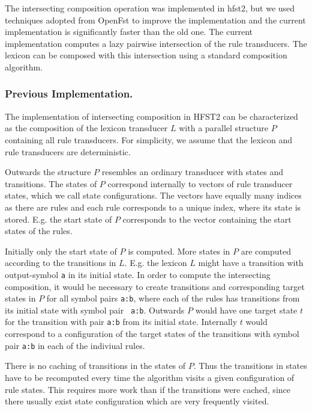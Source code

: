 \documentclass{llncs}
\begin{document}
The intersecting composition operation was implemented in hfst2, but
we used techniques adopted from OpenFst \cite{openfst/2007} to improve
the implementation and the current implementation is significantly
faster than the old one. The current implementation computes a lazy
pairwise intersection of the rule transducers. The lexicon can be
composed with this intersection using a standard composition
algorithm.

\subsubsection{Previous Implementation.}

The implementation of intersecting composition in HFST2 can be
characterized as the composition of the lexicon transducer $L$ with a
parallel structure $P$ containing all rule transducers. For simplicity,
we assume that the lexicon and rule transducers are deterministic.

Outwards the structure $P$ resembles an ordinary transducer with
states and transitions. The states of $P$ correspond internally to
vectors of rule transducer states, which we call state
configurations. The vectors have equally many indices as there are rules
and each rule corresponds to a unique index, where its state is
stored. E.g. the start state of $P$ corresponds to the vector
containing the start states of the rules.

Initially only the start state of $P$ is computed. More states in $P$
are computed according to the transitions in $L$. E.g. the lexicon $L$
might have a transition with output-symbol {\tt a} in its initial
state. In order to compute the intersecting composition, it would be
necessary to create transitions and corresponding target states in $P$
for all symbol pairs {\tt a:b}, where each of the rules has
transitions from its initial state with symbol pair {\tt
  a:b}. Outwards $P$ would have one target state $t$ for the
transition with pair {\tt a:b} from its initial state. Internally $t$
would correspond to a configuration of the target states of the
transitions with symbol pair {\tt a:b} in each of the indiviual rules.

There is no caching of transitions in the states of $P$. Thus the
transitions in states have to be recomputed every time the algorithm
visits a given configuration of rule states. This requires more work
than if the transitions were cached, since there usually exist state
configuration which are very frequently visited.
\end{document}
